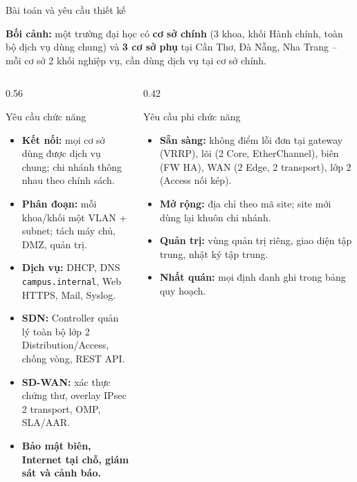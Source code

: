 \documentclass[aspectratio=169, 10pt, xcolor={table}]{beamer}
\newcommand{\compactlist}{\setlength{\itemsep}{1pt}\setlength{\parskip}{0pt}}
\begin{document}
\begin{frame}{Bài toán và yêu cầu thiết kế}
    \begin{softcard}\footnotesize
        \textbf{\color{navy}Bối cảnh:} một trường đại học có \textbf{cơ sở chính} (3 khoa, khối Hành chính, toàn bộ dịch vụ dùng chung)
        và \textbf{3 cơ sở phụ} tại Cần Thơ, Đà Nẵng, Nha Trang -- mỗi cơ sở 2 khối nghiệp vụ, cần dùng dịch vụ tại cơ sở chính.
    \end{softcard}
    \vspace{-0.1cm}
    \begin{columns}[T]
        \begin{column}{0.56\textwidth}
            \begin{card}{Yêu cầu chức năng}
                \scriptsize
                \begin{itemize}\compactlist
                    \item \textbf{Kết nối:} mọi cơ sở dùng được dịch vụ chung; chi nhánh thông nhau theo chính sách.
                    \item \textbf{Phân đoạn:} mỗi khoa/khối một VLAN + subnet; tách máy chủ, DMZ, quản trị.
                    \item \textbf{Dịch vụ:} DHCP, DNS \texttt{campus.internal}, Web HTTPS, Mail, Syslog.
                    \item \textbf{SDN:} Controller quản lý toàn bộ lớp 2 Distribution/Access, chống vòng, REST API.
                    \item \textbf{SD-WAN:} xác thực chứng thư, overlay IPsec 2 transport, OMP, SLA/AAR.
                    \item \textbf{Bảo mật biên, Internet tại chỗ, giám sát và cảnh báo.}
                \end{itemize}
            \end{card}
        \end{column}
        \begin{column}{0.42\textwidth}
            \begin{card}[accent]{Yêu cầu phi chức năng}
                \scriptsize
                \begin{itemize}\compactlist
                    \item \textbf{Sẵn sàng:} không điểm lỗi đơn tại gateway (VRRP), lõi (2 Core, EtherChannel), biên (FW HA), WAN (2 Edge, 2 transport), lớp 2 (Access nối kép).
                    \item \textbf{Mở rộng:} địa chỉ theo mã site; site mới dùng lại khuôn chi nhánh.
                    \item \textbf{Quản trị:} vùng quản trị riêng, giao diện tập trung, nhật ký tập trung.
                    \item \textbf{Nhất quán:} mọi định danh ghi trong bảng quy hoạch.
                \end{itemize}
            \end{card}
        \end{column}
    \end{columns}
\end{frame}
\end{document}
